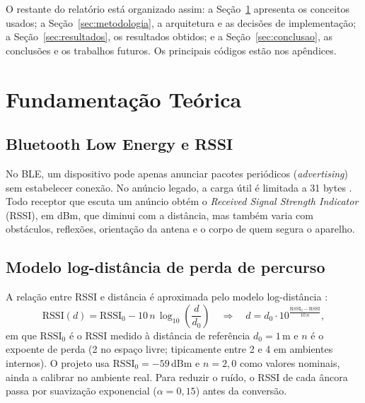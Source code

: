 \documentclass[12pt]{article}
\begin{document}
O restante do relatório está organizado assim: a Seção~\ref{sec:fundamentacao} apresenta os
conceitos usados; a Seção~\ref{sec:metodologia}, a arquitetura e as decisões de implementação; a
Seção~\ref{sec:resultados}, os resultados obtidos; e a Seção~\ref{sec:conclusao}, as conclusões e
os trabalhos futuros. Os principais códigos estão nos apêndices.

\section{Fundamentação Teórica}
\label{sec:fundamentacao}

\subsection{Bluetooth Low Energy e RSSI}
No BLE, um dispositivo pode apenas anunciar pacotes periódicos (\textit{advertising}) sem
estabelecer conexão. No anúncio legado, a carga útil é limitada a 31 bytes
\cite{bluetooth2023core}. Todo receptor que escuta um anúncio obtém o \textit{Received Signal
Strength Indicator} (RSSI), em dBm, que diminui com a distância, mas também varia com obstáculos,
reflexões, orientação da antena e o corpo de quem segura o aparelho.

\subsection{Modelo log-distância de perda de percurso}
A relação entre RSSI e distância é aproximada pelo modelo log-distância \cite{rappaport2002}:
\begin{equation}
  \mathrm{RSSI}(d) = \mathrm{RSSI}_0 - 10\,n\,\log_{10}\!\left(\frac{d}{d_0}\right)
  \quad\Longrightarrow\quad
  d = d_0 \cdot 10^{\frac{\mathrm{RSSI}_0 - \mathrm{RSSI}}{10\,n}},
  \label{eq:pathloss}
\end{equation}
em que $\mathrm{RSSI}_0$ é o RSSI medido à distância de referência $d_0 = 1$\,m e $n$ é o expoente
de perda (2 no espaço livre; tipicamente entre 2 e 4 em ambientes internos). O projeto usa
$\mathrm{RSSI}_0 = -59$\,dBm e $n = 2{,}0$ como valores nominais, ainda a calibrar no ambiente
real. Para reduzir o ruído, o RSSI de cada âncora passa por suavização exponencial
($\alpha = 0{,}15$) antes da conversão.
\end{document}

